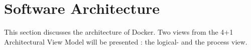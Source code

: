 
\clearpage
\chapter{Software Architecture}
\label{ch:softwarearch}
This section discusses the architecture of Docker.  Two views from the 4+1 Architectural View Model\cite{fourplusone} will be presented : the logical- and the process view.



% 



